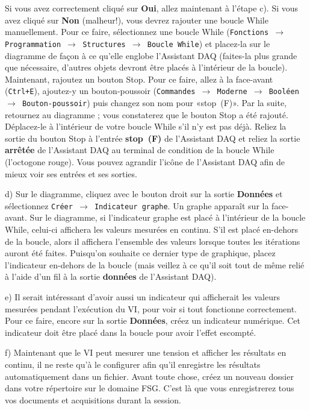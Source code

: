 \documentclass[canadien,12pt,oneside,letterpaper]{article}
\begin{document}
Si vous avez correctement cliqué sur \textbf{Oui}, allez maintenant à l'étape c). Si vous avez cliqué sur \textbf{Non} (malheur!), vous devrez rajouter une boucle While manuellement. Pour ce faire, sélectionnez une boucle While (\texttt{Fonctions $\rightarrow$ Programmation $\rightarrow$ Structures $\rightarrow$ Boucle While}) et placez-la sur le diagramme de façon à ce qu'elle englobe l'Assistant DAQ (faites-la plus grande que nécessaire, d'autres objets devront être placés à l'intérieur de la boucle). Maintenant, rajoutez un bouton Stop. Pour ce faire, allez à la face-avant (\texttt{Ctrl+E}), ajoutez-y un bouton-poussoir (\texttt{Commandes $\rightarrow$ Moderne $\rightarrow$ Booléen $\rightarrow$ Bouton-poussoir}) puis changez son nom pour «stop~(F)». Par la suite, retournez au diagramme ; vous constaterez que le bouton Stop a été rajouté. Déplacez-le à l'intérieur de votre boucle While s'il n'y est pas déjà. Reliez la sortie du bouton Stop à l'entrée \textbf{stop~(F)} de l'Assistant DAQ et reliez la sortie \textbf{arrêtée} de l'Assistant DAQ au terminal de condition de la boucle While (l'octogone rouge). Vous pouvez agrandir l'icône de l'Assistant DAQ afin de mieux voir ses entrées et ses sorties.

d) Sur le diagramme, cliquez avec le bouton droit sur la sortie \textbf{Données} et sélectionnez \texttt{Créer $\rightarrow$ Indicateur graphe}. Un graphe apparaît sur la face-avant. Sur le diagramme, si l'indicateur graphe est placé à l'intérieur de la boucle While, celui-ci affichera les valeurs mesurées en continu. S'il est placé en-dehors de la boucle, alors il affichera l'ensemble des valeurs lorsque toutes les itérations auront été faites. Puisqu'on souhaite ce dernier type de graphique, placez l'indicateur en-dehors de la boucle (mais veillez à ce qu'il soit tout de même relié à l'aide d'un fil à la sortie \textbf{données} de l'Assistant DAQ).

e) Il serait intéressant d'avoir aussi un indicateur qui afficherait les valeurs mesurées pendant l'exécution du VI, pour voir si tout fonctionne correctement. Pour ce faire, encore sur la sortie \textbf{Données}, créez un indicateur numérique. Cet indicateur doit être placé dans la boucle pour avoir l'effet escompté.

f) Maintenant que le VI peut mesurer une tension et afficher les résultats en continu, il ne reste qu'à le configurer afin qu'il enregistre les résultats automatiquement dans un fichier. Avant toute chose, créez un nouveau dossier dans votre répertoire sur le domaine FSG. C'est là que vous enregistrerez tous vos documents et acquisitions durant la session.
\end{document}
